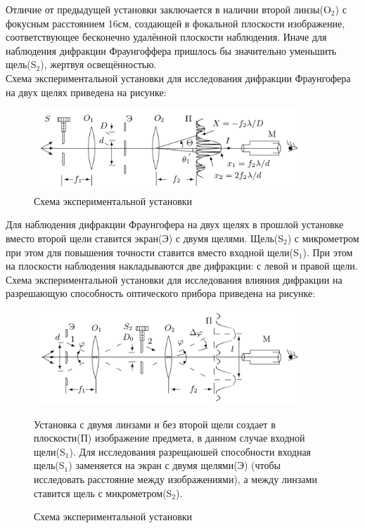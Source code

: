 Отличие от предыдущей установки заключается в наличии второй линзы(O$_2$) с фокусным расстоянием 16см, создающей в фокальной плоскости изображение, соответствующее бесконечно удалённой плоскости наблюдения. Иначе для наблюдения дифракции Фраунгоффера пришлось бы значительно уменьшить щель(S$_2$), жертвуя освещённостью.\\

Схема экспериментальной установки для исследования дифракции Фраунгофера на двух щелях приведена на рисунке:

\begin{figure}[H]
	\centering
	\includegraphics[width=0.9\textwidth]{../Изображения/Схема установки. Дифракция Фраунгофера, две щели.png}
	\caption{Схема экспериментальной установки}
\end{figure}

Для наблюдения дифракции Фраунгофера на двух щелях в прошлой установке вместо второй щели ставится экран(Э) с двумя щелями. Щель(S$_2$) с микрометром при этом для повышения точности ставится вместо входной щели(S$_1$). При этом на плоскости наблюдения накладываются две дифракции: с левой и правой щели.\\

Схема экспериментальной установки для исследования влияния дифракции на разрешающую способность оптического прибора приведена на рисунке:

\begin{figure}[H]
	\centering
	\includegraphics[width=0.9\textwidth]{../Изображения/Схема установки. Разрешающая способность.png}
	\caption{Схема экспериментальной установки}
	
Установка с двумя линзами и без второй щели создает в плоскости(П) изображение предмета, в данном случае входной щели(S$_1$). Для исследования разрещаюшей способности входная щель(S$_1$) заменяется на экран с двумя щелями(Э) (чтобы исследовать расстояние между изображениями), а между линзами ставится щель с микрометром(S$_2$).

\end{figure}

